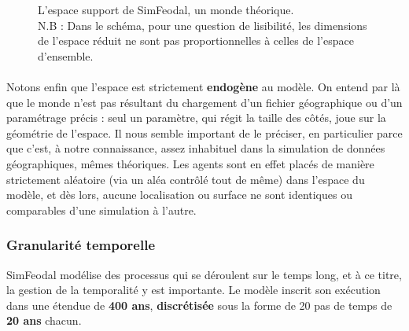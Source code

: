\begin{figure}[H]
	\centering
{}
\caption{L'espace support de SimFeodal, un monde théorique.\\
N.B : Dans le schéma, pour une question de lisibilité, les dimensions de l'espace réduit ne sont pas proportionnelles à celles de l'espace d'ensemble.}
\label{fig:espace-simfeodal}
\end{figure}

\paragraph[Endogène]{} Notons enfin que l'espace est strictement \textbf{endogène} au modèle.
On entend par là que le monde n'est pas résultant du chargement d'un fichier géographique ou d'un paramétrage précis : seul un paramètre, qui régit la taille des côtés, joue sur la géométrie de l'espace.
Il nous semble important de le préciser, en particulier parce que c'est, à notre connaissance, assez inhabituel dans la simulation de données géographiques, mêmes théoriques.
Les agents sont en effet placés de manière strictement aléatoire (via un aléa contrôlé tout de même) dans l'espace du modèle, et dès lors, aucune localisation ou surface ne sont identiques ou comparables d'une simulation à l'autre.


\subsubsection{Granularité temporelle}

SimFeodal modélise des processus qui se déroulent sur le temps long, et à ce titre, la gestion de la temporalité y est importante.
Le modèle inscrit son exécution dans une étendue de \textbf{400 ans}, \textbf{discrétisée} sous la forme de 20 pas de temps de \textbf{20 ans} chacun.

